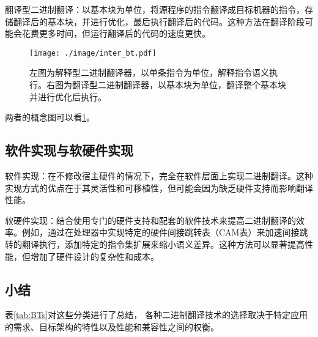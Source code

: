 翻译型二进制翻译：以基本块为单位，将源程序的指令翻译成目标机器的指令，存储翻译后的基本块，并进行优化，最后执行翻译后的代码。这种方法在翻译阶段可能会花费更多时间，但运行翻译后的代码的速度更快。

\begin{figure}[h]
  \centering
  \texttt{[image: ./image/inter\_bt.pdf]}
  \caption{左图为解释型二进制翻译器，以单条指令为单位，解释指令语义执行。右图为翻译型二进制翻译器，以基本块为单位，翻译整个基本块并进行优化后执行。}
  \label{img:inter_bt}
\end{figure}

两者的概念图可以看\ref{img:inter_bt}。

\subsection{软件实现与软硬件实现}
软件实现：在不修改宿主硬件的情况下，完全在软件层面上实现二进制翻译。这种实现方式的优点在于其灵活性和可移植性，但可能会因为缺乏硬件支持而影响翻译性能。

软硬件实现：结合使用专门的硬件支持和配套的软件技术来提高二进制翻译的效率。例如，通过在处理器中实现特定的硬件间接跳转表（CAM表）来加速间接跳转的翻译执行\cite{Godson3}，添加特定的指令集扩展来缩小语义差异。这种方法可以显著提高性能，但增加了硬件设计的复杂性和成本。

\subsection{小结}

表\ref{tab:BTs}对这些分类进行了总结，
各种二进制翻译技术的选择取决于特定应用的需求、目标架构的特性以及性能和兼容性之间的权衡。

